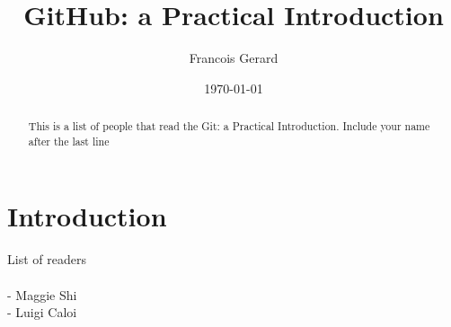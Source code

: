\documentclass[12pt]{article}
\begin{document}
\title{GitHub: a Practical Introduction} %
\author{Francois Gerard}


\date{\today}  %

\maketitle 

\begin{abstract} 

	This is a list of people that read the Git: a Practical Introduction. Include your name after the last line
	
\end{abstract}

\section{Introduction}
List of readers \\ \\
- Maggie Shi \\
- Luigi Caloi  \\
	 
\end{document}
